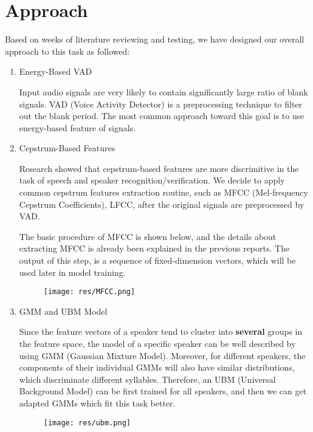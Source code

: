 \section{Approach}

Based on weeks of literature reviewing and testing,
we have designed our overall approach to this task as followed:

\begin{enumerate}
    \item Energy-Based VAD

      Input audio signals are very likely to contain significantly large ratio of blank signals.
      VAD (Voice Activity Detector)
      is a preprocessing technique to filter out the blank period.
      The most common approach toward this goal is to use energy-based feature of signals.

      \item Cepstrum-Based Features

        Research showed that cepstrum-based features are more discrimitive in the task of speech and speaker recognition/verification.
        We decide to apply common cepstrum features extraction routine, such as MFCC (Mel-frequency Cepstrum Coefficients), LFCC,
        after the original signals are preprocessed by VAD.

       The basic procedure of MFCC is shown below, and the details about
       extracting MFCC is already been explained in the previous reports.
       The output of this step, is a sequence of fixed-dimension vectors, which will be used later in model training.

      \begin{figure}[H]
        \centering
        \texttt{[image: res/MFCC.png]}
      \end{figure}

    \item GMM and UBM Model

      Since the feature vectors of a speaker tend to cluster into \textbf{several} groups
      in the feature space,
      the model of a specific speaker can be well described by using GMM (Gaussian Mixture Model).
      Moreover, for different speakers, the components of their individual GMMs
      will also have similar distributions, which discriminate different syllables.
      Therefore, an UBM (Universal Background Model) can be first trained for all speakers,
      and then we can get adapted GMMs which fit this task better.

      \begin{figure}[H]
        \centering
        \texttt{[image: res/ubm.png]}
      \end{figure}


\end{enumerate}
